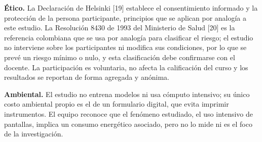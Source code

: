 \medskip
\noindent\textbf{Ético.} La Declaración de Helsinki [19] establece el consentimiento
informado y la protección de la persona participante, principios que se aplican por analogía
a este estudio. La Resolución 8430 de 1993 del Ministerio de Salud [20] es la referencia
colombiana que se usa por analogía para clasificar el riesgo; el estudio no interviene sobre
los participantes ni modifica sus condiciones, por lo que se prevé un riesgo mínimo o nulo,
y esta clasificación debe confirmarse con el docente. La participación es voluntaria, no
afecta la calificación del curso y los resultados se reportan de forma agregada y anónima.

\medskip
\noindent\textbf{Ambiental.} El estudio no entrena modelos ni usa cómputo intensivo; su único
costo ambiental propio es el de un formulario digital, que evita imprimir instrumentos. El
equipo reconoce que el fenómeno estudiado, el uso intensivo de pantallas, implica un consumo
energético asociado, pero no lo mide ni es el foco de la investigación.
